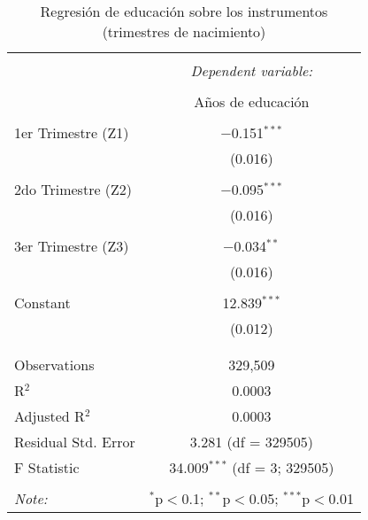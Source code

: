 
\begin{table}[!htbp] \centering 
  \caption{Regresión de educación sobre los instrumentos (trimestres de nacimiento)} 
  \label{} 
\begin{tabular}{@{\extracolsep{5pt}}lc} 
\\[-1.8ex]\hline 
\hline \\[-1.8ex] 
 & \multicolumn{1}{c}{\textit{Dependent variable:}} \\ 
\cline{2-2} 
\\[-1.8ex] & Años de educación \\ 
\hline \\[-1.8ex] 
 1er Trimestre (Z1) & $-$0.151$^{***}$ \\ 
  & (0.016) \\ 
  & \\ 
 2do Trimestre (Z2) & $-$0.095$^{***}$ \\ 
  & (0.016) \\ 
  & \\ 
 3er Trimestre (Z3) & $-$0.034$^{**}$ \\ 
  & (0.016) \\ 
  & \\ 
 Constant & 12.839$^{***}$ \\ 
  & (0.012) \\ 
  & \\ 
\hline \\[-1.8ex] 
Observations & 329,509 \\ 
R$^{2}$ & 0.0003 \\ 
Adjusted R$^{2}$ & 0.0003 \\ 
Residual Std. Error & 3.281 (df = 329505) \\ 
F Statistic & 34.009$^{***}$ (df = 3; 329505) \\ 
\hline 
\hline \\[-1.8ex] 
\textit{Note:}  & \multicolumn{1}{r}{$^{*}$p$<$0.1; $^{**}$p$<$0.05; $^{***}$p$<$0.01} \\ 
\end{tabular} 
\end{table} 
